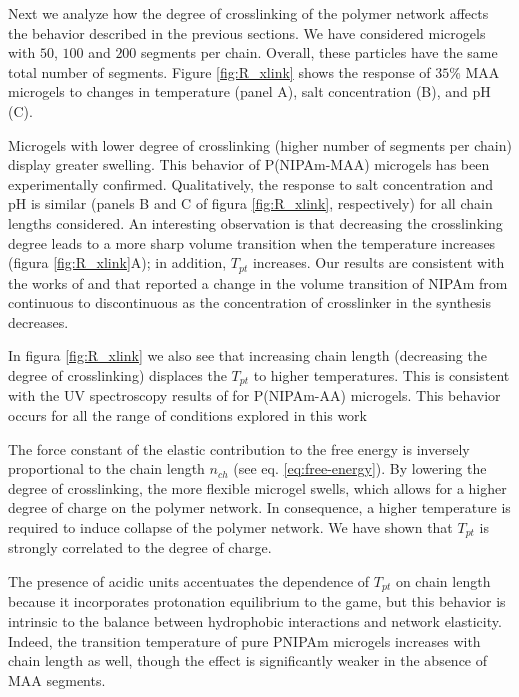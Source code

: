 Next we analyze how the degree of crosslinking of the polymer network affects the behavior described in the previous sections. 
We have considered microgels with $50$, $100$ and $200$ segments per chain.
Overall, these particles have the same total number of segments.
Figure \ref{fig:R_xlink} shows the response of $35\%$ MAA microgels to changes in temperature (panel A), salt concentration (B), and pH (C).



Microgels with lower degree of crosslinking (higher number of segments per chain) display greater swelling.
This behavior of P(NIPAm-MAA) microgels has been experimentally confirmed.
Qualitatively, the response to salt concentration and pH is similar (panels B and C of figura \ref{fig:R_xlink}, respectively) for all chain lengths considered.
An interesting observation is that decreasing the crosslinking degree leads to a more sharp volume transition when the temperature increases (figura \ref{fig:R_xlink}A);
in addition, $T_{pt}$ increases.
Our results are consistent with the works of  and  that reported a change in the volume transition of NIPAm from continuous to discontinuous as the concentration of crosslinker in the synthesis decreases.



In figura \ref{fig:R_xlink} we also see that increasing chain length (decreasing the degree of crosslinking) displaces the $T_{pt}$ to higher temperatures.
This is consistent with the UV spectroscopy results of  for P(NIPAm-AA) microgels.
This behavior occurs for all the range of conditions explored in this work %


The force constant of the elastic contribution to the free energy is inversely proportional to the chain length $n_{ch}$ (see eq. \ref{eq:free-energy}).
By lowering the degree of crosslinking, the more flexible microgel swells, which allows for a higher degree of charge on the polymer network.
In consequence, a higher temperature is required to induce collapse of the polymer network.
We have shown that $T_{pt}$ is strongly correlated to the degree of charge.


The presence of acidic units accentuates the dependence of $T_{pt}$ on chain length because it incorporates protonation equilibrium to the game, but this behavior is intrinsic to the balance between hydrophobic interactions and network elasticity.
Indeed, the transition temperature of pure PNIPAm microgels increases with chain length as well, though the effect is significantly weaker in the absence of MAA segments.



